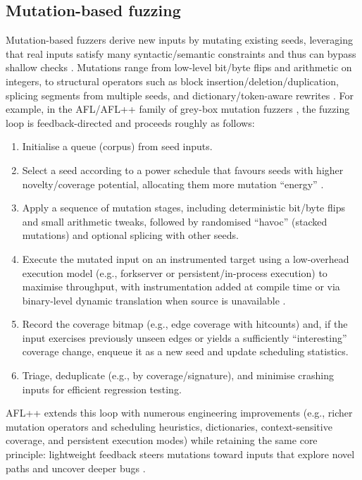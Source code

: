 \subsection{Mutation-based fuzzing}

Mutation-based fuzzers derive new inputs by mutating existing seeds, leveraging that real inputs satisfy many syntactic/semantic constraints and thus can bypass shallow checks \cite{bhme_2016_coveragebased}. Mutations range from low-level bit/byte flips and arithmetic on integers, to structural operators such as block insertion/deletion/duplication, splicing segments from multiple seeds, and dictionary/token-aware rewrites \cite{serebryany_2016_libfuzzer}. For example, in the AFL/AFL++ family of grey-box mutation fuzzers \cite{fioraldi_2020_aflplusplus}, the fuzzing loop is feedback-directed and proceeds roughly as follows:
\begin{enumerate}
  \item Initialise a queue (corpus) from seed inputs.
  \item Select a seed according to a power schedule that favours seeds with higher novelty/coverage potential, allocating them more mutation ``energy'' \cite{bhme_2016_coveragebased}.
  \item Apply a sequence of mutation stages, including deterministic bit/byte flips and small arithmetic tweaks, followed by randomised ``havoc'' (stacked mutations) and optional splicing with other seeds.
  \item Execute the mutated input on an instrumented target using a low-overhead execution model (e.g., forkserver or persistent/in-process execution) to maximise throughput, with instrumentation added at compile time or via binary-level dynamic translation when source is unavailable \cite{bhme_2016_coveragebased,bellard_2005_qemu,luk_2005_pin,serebryany_2016_libfuzzer}.
  \item Record the coverage bitmap (e.g., edge coverage with hitcounts) and, if the input exercises previously unseen edges or yields a sufficiently ``interesting'' coverage change, enqueue it as a new seed and update scheduling statistics.
  \item Triage, deduplicate (e.g., by coverage/signature), and minimise crashing inputs for efficient regression testing.
\end{enumerate}
AFL++ extends this loop with numerous engineering improvements (e.g., richer mutation operators and scheduling heuristics, dictionaries, context-sensitive coverage, and persistent execution modes) \cite{fioraldi_2020_aflplusplus} while retaining the same core principle: lightweight feedback steers mutations toward inputs that explore novel paths and uncover deeper bugs \cite{bhme_2016_coveragebased}.

